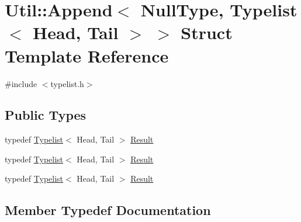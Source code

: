 \hypertarget{structUtil_1_1TL_1_1Append_3_01NullType_00_01Typelist_3_01Head_00_01Tail_01_4_01_4}{}\section{Util\+:\+:Append$<$ Null\+Type, Typelist$<$ Head, Tail $>$ $>$ Struct Template Reference}
\label{structUtil_1_1TL_1_1Append_3_01NullType_00_01Typelist_3_01Head_00_01Tail_01_4_01_4}


{\ttfamily \#include $<$typelist.\+h$>$}

\subsection*{Public Types}
\begin{DoxyCompactItemize}
\item 
typedef \mbox{\hyperlink{structUtil_1_1Typelist}{Typelist}}$<$ Head, Tail $>$ \mbox{\hyperlink{structUtil_1_1TL_1_1Append_3_01NullType_00_01Typelist_3_01Head_00_01Tail_01_4_01_4_aa4d82c7dd5a87a41fa2e1a0046427d13}{Result}}
\item 
typedef \mbox{\hyperlink{structUtil_1_1Typelist}{Typelist}}$<$ Head, Tail $>$ \mbox{\hyperlink{structUtil_1_1TL_1_1Append_3_01NullType_00_01Typelist_3_01Head_00_01Tail_01_4_01_4_aa4d82c7dd5a87a41fa2e1a0046427d13}{Result}}
\item 
typedef \mbox{\hyperlink{structUtil_1_1Typelist}{Typelist}}$<$ Head, Tail $>$ \mbox{\hyperlink{structUtil_1_1TL_1_1Append_3_01NullType_00_01Typelist_3_01Head_00_01Tail_01_4_01_4_aa4d82c7dd5a87a41fa2e1a0046427d13}{Result}}
\end{DoxyCompactItemize}


\subsection{Member Typedef Documentation}
\mbox{\label{structUtil_1_1TL_1_1Append_3_01NullType_00_01Typelist_3_01Head_00_01Tail_01_4_01_4_aa4d82c7dd5a87a41fa2e1a0046427d13}} 
